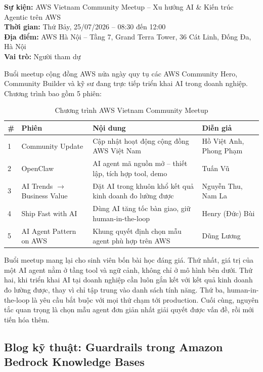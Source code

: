 \documentclass[13pt]{extarticle}
\begin{document}
\textbf{Sự kiện:} AWS Vietnam Community Meetup -- Xu hướng AI \& Kiến trúc
Agentic trên AWS\\
\textbf{Thời gian:} Thứ Bảy, 25/07/2026 -- 08:30 đến 12:00\\
\textbf{Địa điểm:} AWS Hà Nội -- Tầng 7, Grand Terra Tower, 36 Cát Linh,
Đống Đa, Hà Nội\\
\textbf{Vai trò:} Người tham dự

Buổi meetup cộng đồng AWS nửa ngày quy tụ các AWS Community Hero, Community
Builder và kỹ sư đang trực tiếp triển khai AI trong doanh nghiệp. Chương
trình bao gồm 5 phiên:

\begin{longtable}{p{0.5cm}p{3cm}p{6cm}p{4cm}}
\caption{Chương trình AWS Vietnam Community Meetup}
\label{tab:meetup} \\
\toprule
\textbf{\#} & \textbf{Phiên} & \textbf{Nội dung} & \textbf{Diễn giả} \\
\midrule
\endhead
1 & Community Update & Cập nhật hoạt động cộng đồng AWS Việt Nam & Hồ Việt Anh, Phong Phạm \\
2 & OpenClaw & AI agent mã nguồn mở -- thiết lập, tích hợp tool, demo & Tuấn Vũ \\
3 & AI Trends $\rightarrow$ Business Value & Đặt AI trong khuôn khổ kết quả kinh doanh đo lường được & Nguyễn Thu, Nam La \\
4 & Ship Fast with AI & Dùng AI tăng tốc bàn giao, giữ human-in-the-loop & Henry (Đức) Bùi \\
5 & AI Agent Pattern on AWS & Khung quyết định chọn mẫu agent phù hợp trên AWS & Dũng Lương \\
\bottomrule
\end{longtable}

Buổi meetup mang lại cho sinh viên bốn bài học đáng giá. Thứ nhất, giá trị
của một AI agent nằm ở tầng tool và ngữ cảnh, không chỉ ở mô hình bên dưới.
Thứ hai, khi triển khai AI tại doanh nghiệp cần luôn gắn kết với kết quả
kinh doanh đo lường được, thay vì chỉ tập trung vào danh sách tính năng. Thứ
ba, human-in-the-loop là yêu cầu bắt buộc với mọi thứ chạm tới production.
Cuối cùng, nguyên tắc quan trọng là chọn mẫu agent đơn giản nhất giải quyết
được vấn đề, rồi mới tiến hóa thêm.

\subsection{Blog kỹ thuật: Guardrails trong Amazon Bedrock Knowledge Bases}
\end{document}
